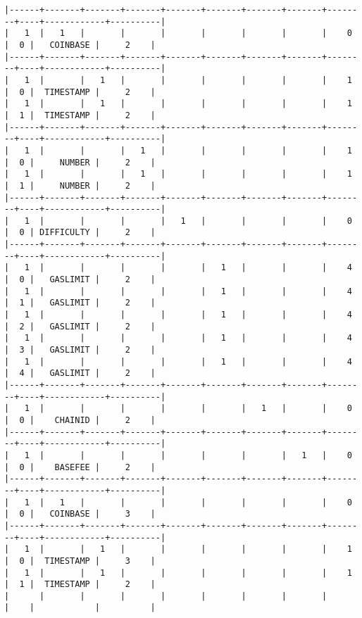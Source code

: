 \documentclass[varwidth=\maxdimen,margin=0.5cm,multi={verbatim}]{standalone}
\begin{document}
\begin{verbatim}
|------+-------+-------+-------+-------+-------+-------+-------+--------+----+------------+----------|
|   1  |   1   |       |       |       |       |       |       |    0   |  0 |   COINBASE |     2    |
|------+-------+-------+-------+-------+-------+-------+-------+--------+----+------------+----------|
|   1  |       |   1   |       |       |       |       |       |    1   |  0 |  TIMESTAMP |     2    |
|   1  |       |   1   |       |       |       |       |       |    1   |  1 |  TIMESTAMP |     2    |
|------+-------+-------+-------+-------+-------+-------+-------+--------+----+------------+----------|
|   1  |       |       |   1   |       |       |       |       |    1   |  0 |     NUMBER |     2    |
|   1  |       |       |   1   |       |       |       |       |    1   |  1 |     NUMBER |     2    |
|------+-------+-------+-------+-------+-------+-------+-------+--------+----+------------+----------|
|   1  |       |       |       |   1   |       |       |       |    0   |  0 | DIFFICULTY |     2    |
|------+-------+-------+-------+-------+-------+-------+-------+--------+----+------------+----------|
|   1  |       |       |       |       |   1   |       |       |    4   |  0 |   GASLIMIT |     2    |
|   1  |       |       |       |       |   1   |       |       |    4   |  1 |   GASLIMIT |     2    |
|   1  |       |       |       |       |   1   |       |       |    4   |  2 |   GASLIMIT |     2    |
|   1  |       |       |       |       |   1   |       |       |    4   |  3 |   GASLIMIT |     2    |
|   1  |       |       |       |       |   1   |       |       |    4   |  4 |   GASLIMIT |     2    |
|------+-------+-------+-------+-------+-------+-------+-------+--------+----+------------+----------|
|   1  |       |       |       |       |       |   1   |       |    0   |  0 |    CHAINID |     2    |
|------+-------+-------+-------+-------+-------+-------+-------+--------+----+------------+----------|
|   1  |       |       |       |       |       |       |   1   |    0   |  0 |    BASEFEE |     2    |
|------+-------+-------+-------+-------+-------+-------+-------+--------+----+------------+----------|
|   1  |   1   |       |       |       |       |       |       |    0   |  0 |   COINBASE |     3    |
|------+-------+-------+-------+-------+-------+-------+-------+--------+----+------------+----------|
|   1  |       |   1   |       |       |       |       |       |    1   |  0 |  TIMESTAMP |     3    |
|   1  |       |   1   |       |       |       |       |       |    1   |  1 |  TIMESTAMP |     2    |
|      |       |       |       |       |       |       |       |        |    |            |          |

\end{verbatim}
\end{document}
